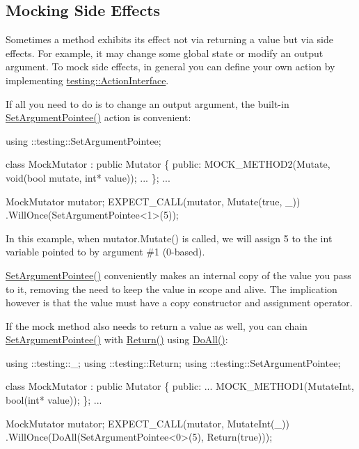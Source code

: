 \subsection*{Mocking Side Effects}

Sometimes a method exhibits its effect not via returning a value but via side effects. For example, it may change some global state or modify an output argument. To mock side effects, in general you can define your own action by implementing {\ttfamily \hyperlink{classtesting_1_1ActionInterface}{testing\+::\+Action\+Interface}}.

If all you need to do is to change an output argument, the built-\/in {\ttfamily \hyperlink{namespacetesting_a03b315d27c91a8e719f2b6c09964130b}{Set\+Argument\+Pointee()}} action is convenient\+:


\begin{DoxyCode}
using ::testing::SetArgumentPointee;

class MockMutator : public Mutator \{
 public:
  MOCK\_METHOD2(Mutate, void(bool mutate, int* value));
  ...
\};
...

  MockMutator mutator;
  EXPECT\_CALL(mutator, Mutate(true, \_))
      .WillOnce(SetArgumentPointee<1>(5));
\end{DoxyCode}


In this example, when {\ttfamily mutator.\+Mutate()} is called, we will assign 5 to the {\ttfamily int} variable pointed to by argument \#1 (0-\/based).

{\ttfamily \hyperlink{namespacetesting_a03b315d27c91a8e719f2b6c09964130b}{Set\+Argument\+Pointee()}} conveniently makes an internal copy of the value you pass to it, removing the need to keep the value in scope and alive. The implication however is that the value must have a copy constructor and assignment operator.

If the mock method also needs to return a value as well, you can chain {\ttfamily \hyperlink{namespacetesting_a03b315d27c91a8e719f2b6c09964130b}{Set\+Argument\+Pointee()}} with {\ttfamily \hyperlink{namespacetesting_af6d1c13e9376c77671e37545cd84359c}{Return()}} using {\ttfamily \hyperlink{namespacetesting_a5f533932753d2af95000e96c4a3042e3}{Do\+All()}}\+:


\begin{DoxyCode}
using ::testing::\_;
using ::testing::Return;
using ::testing::SetArgumentPointee;

class MockMutator : public Mutator \{
 public:
  ...
  MOCK\_METHOD1(MutateInt, bool(int* value));
\};
...

  MockMutator mutator;
  EXPECT\_CALL(mutator, MutateInt(\_))
      .WillOnce(DoAll(SetArgumentPointee<0>(5),
                      Return(true)));
\end{DoxyCode}


